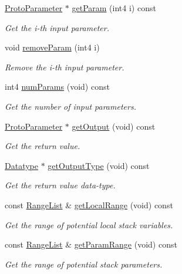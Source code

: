 \begin{DoxyCompactItemize}
\mbox{\hyperlink{class_proto_parameter}{Proto\+Parameter}} $\ast$ \mbox{\hyperlink{class_func_proto_a3c9f97f81ec970bcd40d37f093a1765e}{get\+Param}} (int4 i) const
\begin{DoxyCompactList}\small\item\em Get the i-\/th input parameter. \end{DoxyCompactList}\item 
void \mbox{\hyperlink{class_func_proto_abc9a8f192846b36ba99ed0464bb10862}{remove\+Param}} (int4 i)
\begin{DoxyCompactList}\small\item\em Remove the i-\/th input parameter. \end{DoxyCompactList}\item 
int4 \mbox{\hyperlink{class_func_proto_a8151d0b73aa51650515ba3f26e73e903}{num\+Params}} (void) const
\begin{DoxyCompactList}\small\item\em Get the number of input parameters. \end{DoxyCompactList}\item 
\mbox{\hyperlink{class_proto_parameter}{Proto\+Parameter}} $\ast$ \mbox{\hyperlink{class_func_proto_a92e6871d7ee764e7c5aa8b10bf47705a}{get\+Output}} (void) const
\begin{DoxyCompactList}\small\item\em Get the return value. \end{DoxyCompactList}\item 
\mbox{\hyperlink{class_datatype}{Datatype}} $\ast$ \mbox{\hyperlink{class_func_proto_ad457e79208b6e7f4f030c2c325db1dba}{get\+Output\+Type}} (void) const
\begin{DoxyCompactList}\small\item\em Get the return value data-\/type. \end{DoxyCompactList}\item 
const \mbox{\hyperlink{class_range_list}{Range\+List}} \& \mbox{\hyperlink{class_func_proto_ad8bbc6db7bc4ae8105688a0321fa1ae4}{get\+Local\+Range}} (void) const
\begin{DoxyCompactList}\small\item\em Get the range of potential local stack variables. \end{DoxyCompactList}\item 
const \mbox{\hyperlink{class_range_list}{Range\+List}} \& \mbox{\hyperlink{class_func_proto_a147ea3f4d50df93a0ff16f17ea204ac9}{get\+Param\+Range}} (void) const
\begin{DoxyCompactList}\small\item\em Get the range of potential stack parameters. \end{DoxyCompactList}\item 

\end{DoxyCompactItemize}
